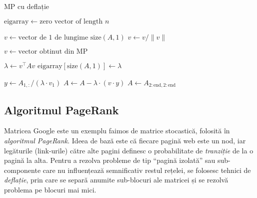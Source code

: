 \documentclass{exam}
\begin{document}
\begin{algorithm}
	\caption{MP cu deflație}
	\begin{algorithmic}[1]
		\State \( \text{eigarray} \gets \text{zero vector of length } n \)

		\State \( v \gets \text{vector de 1 de lungime } \text{size}(A, 1) \)
		\State \( v \gets v / \|v\| \)

		\State \( v \gets \text{vector obtinut din MP }\)

		\State \( \lambda \gets v^\top A v \)
		\State \( \text{eigarray}[\text{size}(A, 1)] \gets \lambda \)

		\State \( y \gets A_{1,:} / (\lambda \cdot v_1) \)
		\State \( A \gets A - \lambda \cdot (v \cdot y) \)
		\State \( A \gets A_{2:\text{end}, 2:\text{end}} \)
		\EndWhile
	\end{algorithmic}
\end{algorithm}

\subsection{Algoritmul PageRank}

Matricea Google este un exemplu faimos de matrice stocastică, folosită în
\textit{algoritmul PageRank}. Ideea de bază este că fiecare pagină web este un
nod, iar legăturile (link-urile) către alte pagini definesc o probabilitate de
\textit{tranziție} de la o pagină la alta. Pentru a rezolva probleme de tip
“pagină izolată” sau sub-componente care nu influențează semnificativ restul
rețelei, se folosesc tehnici de \textit{deflație}, prin care se separă anumite
sub-blocuri ale matricei și se rezolvă problema pe blocuri mai mici.
\end{document}
